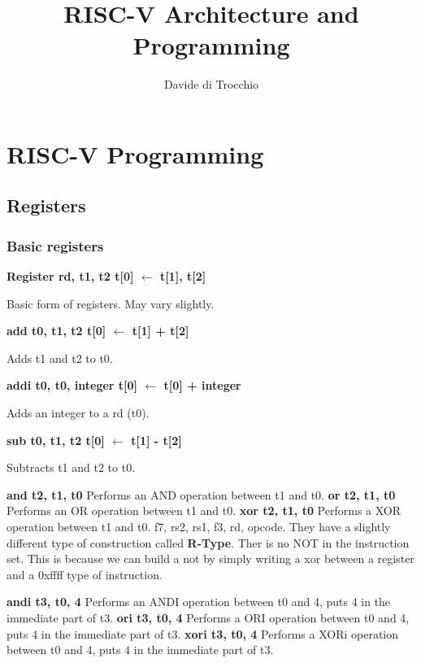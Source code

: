 \documentclass{article}
\title{RISC-V Architecture and Programming}
\author{Davide di Trocchio}
\begin{document}
    \maketitle
    \newpage

    \section{RISC-V Programming}
    \subsection{Registers}
    \subsubsection{Basic registers}
    \textbf{Register rd, t1, t2 \qquad \qquad t[0] $\leftarrow$ t[1], t[2]}
    \par
    Basic form of registers. May vary slightly.\medbreak
    
    \textbf{add t0, t1, t2 \qquad \qquad t[0] $\leftarrow$ t[1] + t[2]}
    \par
    Adds t1 and t2 to t0. \medbreak

    \textbf{addi t0, t0, integer \qquad \qquad t[0] $\leftarrow$ t[0] + integer}
    \par
    Adds an integer to a rd (t0). \medbreak

    \textbf{sub t0, t1, t2 \qquad \qquad t[0] $\leftarrow$ t[1] - t[2]}
    \par
    Subtracts t1 and t2 to t0. \medbreak

    \textbf{and t2, t1, t0}  \smallbreak
    Performs an AND operation between t1 and t0.\smallbreak
    \textbf{or t2, t1, t0}   \smallbreak
    Performs an OR operation between t1 and t0.\smallbreak
    \textbf{xor t2, t1, t0}  \smallbreak
    Performs a XOR operation between t1 and t0.\smallbreak
    f7, rs2, rs1, f3, rd, opcode. They have a slightly different type of 
    construction called \textbf{R-Type}. Ther is no NOT in the instruction set. 
    This is because we can build a not by simply writing a xor between a register 
    and a 0xffff type of instruction.\medbreak

    
    \textbf{andi t3, t0, 4}  \smallbreak
    Performs an ANDI operation between t0 and 4, puts 4 in the immediate part
    of t3.\smallbreak
    \textbf{ori t3, t0, 4}   \smallbreak
    Performs a ORI operation between t0 and 4, puts 4 in the immediate part
    of t3.\smallbreak
    \textbf{xori t3, t0, 4}  \smallbreak
    Performs a XORi operation between t0 and 4, puts 4 in the immediate part
    of t3.\smallbreak
\end{document}
